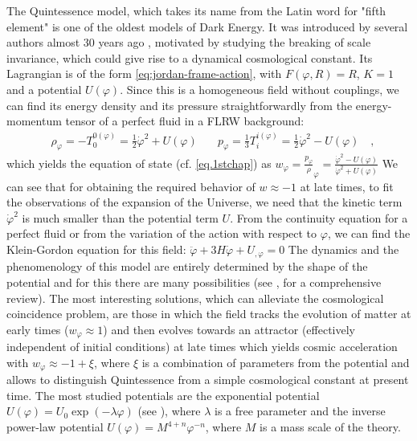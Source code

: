 The Quintessence model, which takes its name from the Latin word for "fifth element"
is one of the oldest models of Dark Energy. It was introduced by several authors almost 30 years
ago \cite{Wetterich_1988, Ratra, references in Lucas, book}, motivated by studying the 
breaking of scale invariance, which could give rise to a dynamical cosmological constant.
Its Lagrangian is of the form \cref{eq:jordan-frame-action}, with
$F(\varphi, R) = R$, $K = 1$ and a potential $U(\varphi)$.
Since this is a homogeneous field without couplings, we can find its energy density and its pressure 
straightforwardly from the energy-momentum tensor of a perfect fluid in a FLRW background:
\begin{align}
&\rho_{\varphi} = -T^{0 (\varphi)}_0 = \frac{1}{2}\dot\varphi^2 + U(\varphi) \quad 
&p_{\varphi} = \frac{1}{3} T^{i (\varphi)}_i = \frac{1}{2}\dot\varphi^2 - U(\varphi) \quad ,
\end{align}
which yields the equation of state (cf. \cref{eq.1stchap}) as
\beeqp$
w_\varphi  = \frac{p_{\varphi}}\rho_{\varphi} = \frac{\dot\varphi^2 - U(\varphi)}{\dot\varphi^2 + U(\varphi)}
$
We can see that for obtaining the required behavior of $w\approx -1$ at late times, to fit 
the observations of the expansion of the Universe, we need that the kinetic term $\dot\varphi^2$
is much smaller than the potential term $U$.
From the continuity equation for a perfect fluid or from the variation of the action with respect to $\varphi$,
we can find the Klein-Gordon equation for this field:
\beeqp$
\label{eq:Klein-Gordon-Quintessence}
\ddot \varphi + 3 H \dot \varphi + U_{,\varphi} = 0
$
The dynamics and the phenomenology of this model are entirely determined by the shape of the potential
and for this there are many possibilities (see \cite[chap. 7]{amendola_dark_2010}, for a comprehensive review).
The most interesting solutions, which can alleviate the cosmological coincidence problem, are those in which the field
tracks the evolution of matter at early times ($w_\varphi \approx 1$) and then 
evolves towards an attractor (effectively independent of initial conditions) 
at late times which yields cosmic acceleration with $w_\varphi \approx -1+\xi$,
where $\xi$ is a combination of parameters from the potential and allows
to distinguish Quintessence from a simple cosmological constant at present time.
The most studied potentials are the exponential potential $U(\varphi) = U_0\exp(-\lambda \varphi)$ 
(see \cite{copeland}), where $\lambda$ is a free parameter
and the inverse power-law potential $U(\varphi) = M^{4+n} \varphi^{-n}$,
where $M$ is a mass scale of the theory.

